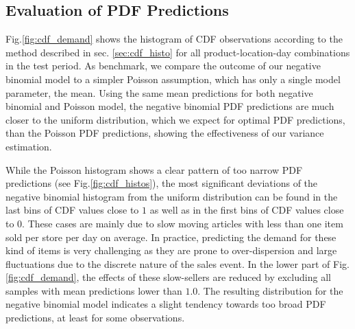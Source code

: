 \documentclass[BCOR=1mm, DIV=calc,10pt,
twoside=true,
twocolumn,
headings=normal]{scrartcl}
\newcommand{\fig}{Fig.}
\begin{document}
\subsection{Evaluation of PDF Predictions}

\fig \ref{fig:cdf_demand} shows the histogram of CDF observations according to the method described in sec. \ref{sec:cdf_histo} for all product-location-day combinations in the test period. As benchmark, we compare the outcome of our negative binomial model to a simpler Poisson assumption, which has only a single model parameter, the mean. Using the same mean predictions for both negative binomial and Poisson model, the negative binomial PDF predictions are much closer to the uniform distribution, which we expect for optimal PDF predictions, than the Poisson PDF predictions, showing the effectiveness of our variance estimation.

\noindent
While the Poisson histogram shows a clear pattern of too narrow PDF predictions (see \fig \ref{fig:cdf_histos}), the most significant deviations of the negative binomial histogram from the uniform distribution can be found in the last bins of CDF values close to $1$ as well as in the first bins of CDF values close to $0$. These cases are mainly due to slow moving articles with less than one item sold per store per day on average. In practice, predicting the demand for these kind of items is very challenging as they are prone to over-dispersion and large fluctuations due to the discrete nature of the sales event. In the lower part of \fig \ref{fig:cdf_demand}, the effects of these slow-sellers are reduced by excluding all samples with mean predictions lower than $1.0$. The resulting distribution for the negative binomial model indicates a slight tendency towards too broad PDF predictions, at least for some observations.
\end{document}
